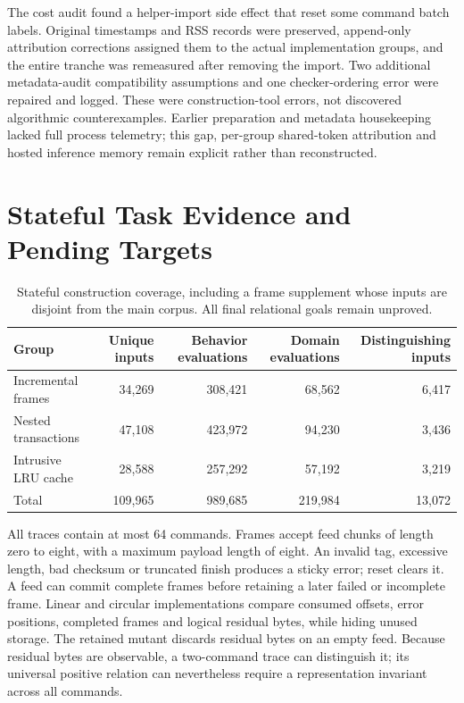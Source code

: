 \documentclass{article}
\begin{document}
The cost audit found a helper-import side effect that reset some command batch labels. Original timestamps and RSS records were preserved, append-only attribution corrections assigned them to the actual implementation groups, and the entire tranche was remeasured after removing the import. Two additional metadata-audit compatibility assumptions and one checker-ordering error were repaired and logged. These were construction-tool errors, not discovered algorithmic counterexamples. Earlier preparation and metadata housekeeping lacked full process telemetry; this gap, per-group shared-token attribution and hosted inference memory remain explicit rather than reconstructed.

\section{Stateful Task Evidence and Pending Targets}

\begin{table}[t]
\centering\small
\caption{Stateful construction coverage, including a frame supplement whose inputs are disjoint from the main corpus. All final relational goals remain unproved.}
\begin{tabular}{lrrrr}
\toprule
Group & Unique inputs & Behavior evaluations & Domain evaluations & Distinguishing inputs \\
\midrule
Incremental frames & 34,269 & 308,421 & 68,562 & 6,417 \\
Nested transactions & 47,108 & 423,972 & 94,230 & 3,436 \\
Intrusive LRU cache & 28,588 & 257,292 & 57,192 & 3,219 \\
\midrule
Total & 109,965 & 989,685 & 219,984 & 13,072 \\
\bottomrule
\end{tabular}
\end{table}

All traces contain at most 64 commands. Frames accept feed chunks of length zero to eight, with a maximum payload length of eight. An invalid tag, excessive length, bad checksum or truncated finish produces a sticky error; reset clears it. A feed can commit complete frames before retaining a later failed or incomplete frame. Linear and circular implementations compare consumed offsets, error positions, completed frames and logical residual bytes, while hiding unused storage. The retained mutant discards residual bytes on an empty feed. Because residual bytes are observable, a two-command trace can distinguish it; its universal positive relation can nevertheless require a representation invariant across all commands.
\end{document}
